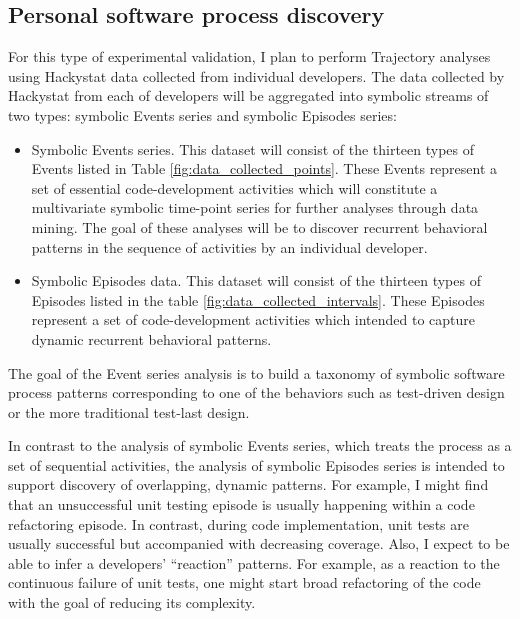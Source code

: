 \subsection{Personal software process discovery}
For this type of experimental validation, I plan to perform Trajectory analyses using Hackystat data collected from individual developers. The data collected by Hackystat from each of developers will be aggregated into symbolic streams of two types: symbolic Events series and symbolic Episodes series:
\begin{itemize}
	\item Symbolic Events series. This dataset will consist of the thirteen types of Events listed in Table \ref{fig:data_collected_points}. These Events represent a set of essential code-development activities which will constitute a multivariate symbolic time-point series for further analyses through data mining. The goal of these analyses will be to discover recurrent behavioral patterns in the sequence of activities by an individual developer. 
	\item Symbolic Episodes data. This dataset will consist of the thirteen types of Episodes listed in the table \ref{fig:data_collected_intervals}. These Episodes represent a set of code-development activities which intended to capture dynamic recurrent behavioral patterns.
\end{itemize}

The goal of the Event series analysis is to build a taxonomy of symbolic software process patterns corresponding to one of the behaviors such as test-driven design or the more traditional test-last design.

In contrast to the analysis of symbolic Events series, which treats the process as a set of sequential activities, the analysis of symbolic Episodes series is intended to support discovery of overlapping, dynamic patterns. For example, I might find that an unsuccessful unit testing episode is usually happening within a code refactoring episode. In contrast, during code implementation, unit tests are usually successful but accompanied with decreasing coverage. Also, I expect to be able to infer a developers' ``reaction'' patterns. For example, as a reaction to the continuous failure of unit tests, one might start broad refactoring of the code with the goal of reducing its complexity. 

